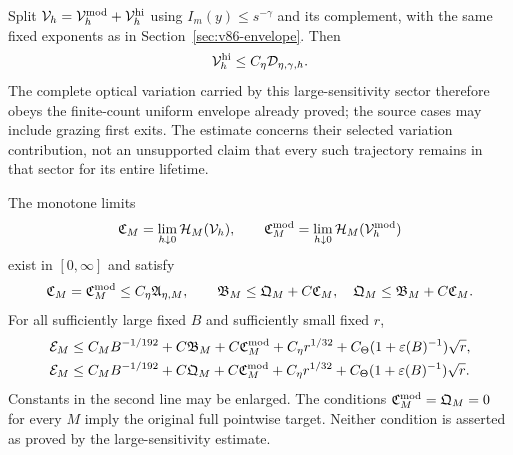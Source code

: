 Split $\mathcal V_h=\mathcal V_h^{\rm mod}+\mathcal V_h^{\rm hi}$
using $I_m(y)\le s^{-\gamma}$ and its complement, with the same
fixed exponents as in Section~\ref{sec:v86-envelope}. Then
\begin{equation}\label{eq:v86-causal-hi}
 \mathcal V_h^{\rm hi}\le C_\eta\mathcal D_{\eta,\gamma,h}.
\end{equation}
The complete optical variation carried by this large-sensitivity
sector therefore obeys the finite-count uniform envelope already
proved; the source cases may include grazing first exits.
The estimate concerns their selected variation contribution, not
an unsupported claim that every such trajectory remains in that
sector for its entire lifetime.

\begin{theorem}
\label{thm:v86-endpoint}
The monotone limits
\[
 \mathfrak C_M=\lim_{h\downarrow0}\mathcal H_M(\mathcal V_h),\qquad
 \mathfrak C_M^{\rm mod}
       =\lim_{h\downarrow0}\mathcal H_M(\mathcal V_h^{\rm mod})
\]
exist in $[0,\infty]$ and satisfy
\begin{equation}\label{eq:v86-charge-comparison}
 \mathfrak C_M=\mathfrak C_M^{\rm mod}
       \le C_\eta\mathfrak A_{\eta,M},\qquad
 \mathfrak B_M\le\mathfrak Q_M+C\mathfrak C_M,\quad
 \mathfrak Q_M\le\mathfrak B_M+C\mathfrak C_M.
\end{equation}
For all sufficiently large fixed $B$ and sufficiently small fixed $r$,
\begin{align}
 \mathcal E_M\le{}&C_MB^{-1/192}
       +C\mathfrak B_M+C\mathfrak C_M^{\rm mod}
       +C_\eta r^{1/32}
       +C_\Theta(1+\varepsilon(B)^{-1})\sqrt r,\label{eq:v86-endpoint-B}\\
 \mathcal E_M\le{}&C_MB^{-1/192}
       +C\mathfrak Q_M+C\mathfrak C_M^{\rm mod}
       +C_\eta r^{1/32}
       +C_\Theta(1+\varepsilon(B)^{-1})\sqrt r.\label{eq:v86-endpoint-Q}
\end{align}
Constants in the second line may be enlarged. The conditions
$\mathfrak C_M^{\rm mod}=\mathfrak Q_M=0$ for every $M$ imply
the original full pointwise target. Neither condition is asserted
as proved by the large-sensitivity estimate.
\end{theorem}
